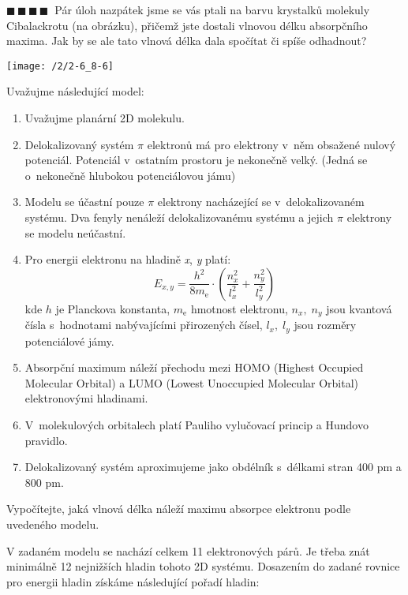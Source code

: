 \documentclass{book}
\newcommand{\ctyri}{$\blacksquare \, \blacksquare \, \blacksquare \, \blacksquare \; \; $}
\renewenvironment{quotation}{\par}{\par} %
\begin{document}
\hrulefill %
\begin{quotation}
\ctyri Pár úloh nazpátek jsme se vás ptali na barvu krystalků molekuly Cibalackrotu
(na obrázku), přičemž jste dostali vlnovou délku absorpčního maxima.
Jak by se ale tato vlnová délka dala spočítat či spíše odhadnout? 

\begin{center}
\texttt{[image: /2/2-6\_8-6]}
\end{center}

Uvažujme následující model: 

\begin{enumerate}
    

\item  Uvažujme planární 2D molekulu. 

\item  Delokalizovaný systém $\pi$ elektronů má pro elektrony v~něm obsažené
nulový potenciál. Potenciál v~ostatním prostoru je nekonečně velký. (Jedná se o~nekonečně hlubokou potenciálovou jámu) 

\item  Modelu se účastní pouze $\pi$ elektrony nacházející se v~delokalizovaném
systému. Dva fenyly nenáleží delokalizovanému systému a jejich $\pi$
elektrony se modelu neúčastní. 

\item  Pro energii elektronu na hladině \textit{x}, \textit{y} platí: 
\[
E_{x,y}=\frac{h^{2}}{8m_{\mathrm{e}}}\cdot\left(\frac{n_{x}^{2}}{l_{x}^{2}}+\frac{n_{y}^{2}}{l_{y}^{2}}\right)
\]
kde $h$ je Planckova konstanta, $m_{\mathrm{e}}$ hmotnost elektronu, $n_{x},\;n_{y}$
jsou kvantová čísla s~hodnotami nabývajícími přirozených čísel, $l_{x},\;l_{y}$
jsou rozměry potenciálové jámy. 

\item  Absorpční maximum náleží přechodu mezi HOMO (Highest Occupied Molecular
Orbital) a LUMO (Lowest Unoccupied Molecular Orbital) elektronovými
hladinami. 

\item  V~molekulových orbitalech platí Pauliho vylučovací princip a Hundovo
pravidlo. 

\item  Delokalizovaný systém aproximujeme jako obdélník s~délkami stran
400 pm a 800 pm. 
\end{enumerate}
Vypočítejte, jaká vlnová délka náleží maximu absorpce elektronu podle
uvedeného modelu. 
\end{quotation} \dotfill \par 
V zadaném modelu se nachází celkem 11 elektronových párů. Je třeba
znát minimálně 12 nejnižších hladin tohoto 2D systému. Dosazením do
zadané rovnice pro energii hladin získáme následující pořadí hladin:
\end{document}
